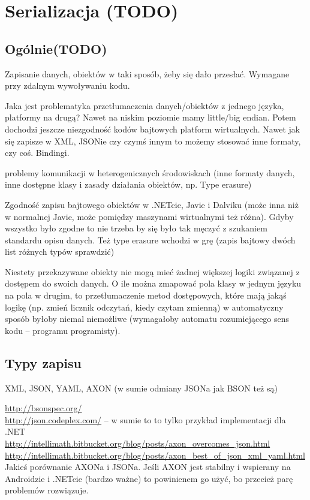 \section{Serializacja (TODO)}
\subsection{Ogólnie(TODO)}
Zapisanie danych, obiektów w taki sposób, żeby się dało przesłać. Wymagane przy zdalnym wywoływaniu kodu.

Jaka jest problematyka przetłumaczenia danych/obiektów z jednego języka, platformy na drugą?
Nawet na niskim poziomie mamy little/big endian. Potem dochodzi jeszcze niezgodność kodów bajtowych platform wirtualnych.
Nawet jak się zapisze w XML, JSONie czy czymś innym to możemy stosować inne formaty, czy coś. Bindingi.

problemy komunikacji w heterogenicznych środowiskach (inne formaty danych, inne dostępne klasy i zasady działania obiektów, np. Type erasure)

Zgodność zapisu bajtowego obiektów w .NETcie, Javie i Dalviku (może inna niż w normalnej Javie, może pomiędzy maszynami wirtualnymi też różna). Gdyby wszystko było zgodne to nie trzeba by się było tak męczyć z szukaniem standardu opisu danych. Też type erasure wchodzi w grę (zapis bajtowy dwóch list różnych typów sprawdzić)

Niestety przekazywane obiekty nie mogą mieć żadnej większej logiki związanej z dostępem do swoich danych. O ile można zmapować pola klasy w jednym języku na pola w drugim, to przetłumaczenie metod dostępowych, które mają jakąś logikę (np. zmień licznik odczytań, kiedy czytam zmienną) w automatyczny sposób byłoby niemal niemożliwe (wymagałoby automatu rozumiejącego sens kodu -- programu programisty).

\subsection{Typy zapisu}
XML, JSON, YAML, AXON (w sumie odmiany JSONa jak BSON też są)

\url{http://bsonspec.org/}\\
\url{http://json.codeplex.com/} -- w sumie to to tylko przykład implementacji dla .NET\\

\url{http://intellimath.bitbucket.org/blog/posts/axon_overcomes_json.html}\\
\url{http://intellimath.bitbucket.org/blog/posts/axon_best_of_json_xml_yaml.html}\\
Jakieś porównanie AXONa i JSONa. Jeśli AXON jest stabilny i wspierany na Androidzie i .NETcie (bardzo ważne) to powinienem go użyć, bo przecież parę problemów rozwiązuje.

